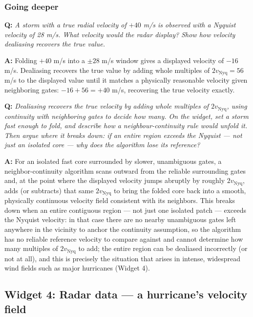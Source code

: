 \documentclass[11pt]{article}
\newenvironment{qa}[1]{\par\noindent\textbf{\color{qgray}Q: }\emph{#1}\par\noindent\textbf{A: }}{\par\vspace{6pt}}
\newcommand{\tier}[1]{\subsubsection*{#1}}
\begin{document}
\tier{Going deeper}
\begin{qa}{A storm with a true radial velocity of $+40$ m/s is observed with a Nyquist velocity of 28 m/s. What velocity would the radar display? Show how velocity dealiasing recovers the true value.}
Folding $+40$ m/s into a $\pm28$ m/s window gives a displayed velocity of $-16$ m/s. Dealiasing recovers the true value by adding whole multiples of $2v_{\mathrm{Nyq}}=56$ m/s to the displayed value until it matches a physically reasonable velocity given neighboring gates: $-16 + 56 = +40$ m/s, recovering the true velocity exactly.
\end{qa}
\begin{qa}{Dealiasing recovers the true velocity by adding whole multiples of $2v_{\mathrm{Nyq}}$, using continuity with neighboring gates to decide how many. On the widget, set a storm fast enough to fold, and describe how a neighbour-continuity rule would unfold it. Then argue where it breaks down: if an \emph{entire} region exceeds the Nyquist --- not just an isolated core --- why does the algorithm lose its reference?}
For an isolated fast core surrounded by slower, unambiguous gates, a neighbor-continuity algorithm scans outward from the reliable surrounding gates and, at the point where the displayed velocity jumps abruptly by roughly $2v_{\mathrm{Nyq}}$, adds (or subtracts) that same $2v_{\mathrm{Nyq}}$ to bring the folded core back into a smooth, physically continuous velocity field consistent with its neighbors. This breaks down when an entire contiguous region --- not just one isolated patch --- exceeds the Nyquist velocity: in that case there are no nearby unambiguous gates left anywhere in the vicinity to anchor the continuity assumption, so the algorithm has no reliable reference velocity to compare against and cannot determine how many multiples of $2v_{\mathrm{Nyq}}$ to add; the entire region can be dealiased incorrectly (or not at all), and this is precisely the situation that arises in intense, widespread wind fields such as major hurricanes (Widget 4).
\end{qa}

\subsection{Widget 4: Radar data --- a hurricane's velocity field}
\end{document}
